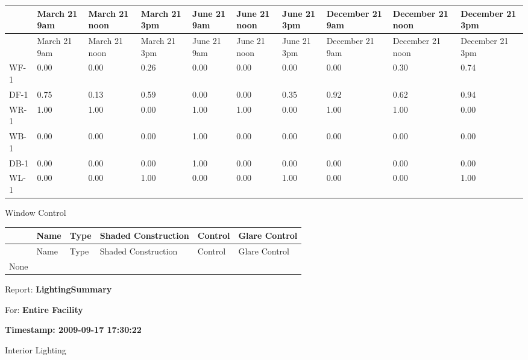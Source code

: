 \begin{longtable}[c]{p{0.6in}p{0.6in}p{0.6in}p{0.6in}p{0.6in}p{0.6in}p{0.6in}p{0.6in}p{0.6in}p{0.6in}}
\toprule 
~ & March 21 9am & March 21 noon & March 21 3pm & June 21 9am & June 21 noon & June 21 3pm & December 21 9am & December 21 noon & December 21 3pm \tabularnewline
\midrule
\endfirsthead

\toprule 
~ & March 21 9am & March 21 noon & March 21 3pm & June 21 9am & June 21 noon & June 21 3pm & December 21 9am & December 21 noon & December 21 3pm \tabularnewline
\midrule
\endhead

WF-1 & 0.00 & 0.00 & 0.26 & 0.00 & 0.00 & 0.00 & 0.00 & 0.30 & 0.74 \tabularnewline
DF-1 & 0.75 & 0.13 & 0.59 & 0.00 & 0.00 & 0.35 & 0.92 & 0.62 & 0.94 \tabularnewline
WR-1 & 1.00 & 1.00 & 0.00 & 1.00 & 1.00 & 0.00 & 1.00 & 1.00 & 0.00 \tabularnewline
WB-1 & 0.00 & 0.00 & 0.00 & 1.00 & 0.00 & 0.00 & 0.00 & 0.00 & 0.00 \tabularnewline
DB-1 & 0.00 & 0.00 & 0.00 & 1.00 & 0.00 & 0.00 & 0.00 & 0.00 & 0.00 \tabularnewline
WL-1 & 0.00 & 0.00 & 1.00 & 0.00 & 0.00 & 1.00 & 0.00 & 0.00 & 1.00 \tabularnewline
\bottomrule
\end{longtable}

Window Control

\begin{longtable}[c]{@{}llllll@{}}
\toprule 
~ & Name & Type & Shaded Construction & Control & Glare Control \tabularnewline
\midrule
\endfirsthead

\toprule 
~ & Name & Type & Shaded Construction & Control & Glare Control \tabularnewline
\midrule
\endhead

None & ~ & ~ & ~ & ~ & ~ \tabularnewline
\bottomrule
\end{longtable}

Report: \textbf{LightingSummary}

For: \textbf{Entire Facility}

\textbf{Timestamp: 2009-09-17 17:30:22}

Interior Lighting

